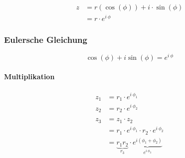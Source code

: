 \begin{align*}
	z & = r (\cos(\phi)) + i \cdot \sin(\phi) \\
	  & = r \cdot e^{i\ \phi}
\end{align*}

\subsubsection{Eulersche Gleichung}

\[
	\cos(\phi) + i \sin(\phi) = e^{i\ \phi}
\]

\paragraph{Multiplikation}

\begin{align*}
	z_1 & = r_1 \cdot e^{i\ \phi_1}                                                              \\
	z_2 & = r_2 \cdot e^{i\ \phi_2}                                                              \\
	\\
	z_3 & = z_1 \cdot z_2                                                                        \\
	    & = r_1 \cdot e^{i\ \phi_1} \cdot r_2 \cdot e^{i\ \phi_2}                                \\
	    & = \underbrace{r_1 r_2}_{r_3} \cdot \underbrace{e^{i(\phi_1 + \phi_2)}}_{e^{i\ \phi_3}}
\end{align*}

